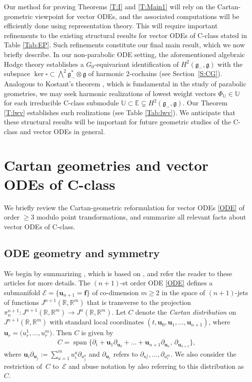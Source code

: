 \documentclass[10pt,a4paper]{amsart}
\newcommand\tensor{\otimes}
\DeclareMathOperator{\sn}{span}
\newcommand{\g}{\mathfrak{g}}
\newcommand\bu{\mathbf{u}}
\newcommand{\R}{\mathbb{R}}
\newcommand\bbE{\mathbb{E}}
\newcommand\bbU{\mathbb{U}}
\newcommand\cE{\mathcal{E}}
\numberwithin{equation}{section}
\begin{document}
Our method for proving Theorems \ref{T:I} and \ref{T:Main1} will rely on the Cartan-geometric viewpoint for vector ODEs, and the associated computations will be efficiently done using representation theory. This will require important refinements to the existing structural results for vector ODEs of C-class stated in Table \ref{Tab:EP}. Such refinements constitute our final main result, which we now briefly describe. In our non-parabolic ODE setting, the aforementioned algebraic Hodge theory establishes a $G_0$-equivariant identification of $H^2(\g_-,\g)$ with the subspace ${\ker \square \subset \bigwedge^2 \g_-^* \tensor \g}$ of harmonic 2-cochains (see Section~\ref{S:CG}). Analogous to Kostant's theorem \cite{Kostant1961}, which is fundamental in the study of parabolic geometries, we may seek harmonic realizations of lowest weight vectors $\Phi_\bbU \in \bbU$ for each irreducible C-class submodule $\bbU \subset \bbE \subsetneq H^2(\g_-,\g)$. Our Theorem \ref{T:lwv} establishes such realizations (see Table \ref{Tab:lwv}). We anticipate that these structural results will be important for future geometric studies of the C-class and vector ODEs in general.

\section{Cartan geometries and vector ODEs of C-class} \label{S:CGP}

We briefly review the Cartan-geometric reformulation for vector ODEs \eqref{ODE} of order $\ge 3$ modulo point transformations, and summarize all relevant facts about vector ODEs of C-class.

\subsection{ODE geometry and symmetry}\label{S:GS}

We begin by summarizing \cite[Section~2.1]{KT2021}, which is based on \cite{Doubrov2001,DKM1999,DM2014}, and refer the reader to these articles for more details. The $(n+1)$-st order ODE \eqref{ODE} defines a submanifold ${\mathcal{E} = \{ \bu_{n+1} = \mathbf{f} \}}$ of co-dimension $m \ge 2$ in the space of $(n+1)$-jets of functions $J^{n+1}(\R, \R^m)$ that is transverse to the projection $\pi_n^{n+1}\colon J^{n+1}(\R, \R^m) \to J^{n}(\R, \R^m)$. Let $C$ denote the {\em Cartan distribution} on $J^{n+1}(\R, \R^m)$ with standard local coordinates $(t, \bu_0, \bu_1,\dots,\bu_{n+1})$, where $\bu_r = \big(u_r^1,\dots,u_r^m\big)$. Then $C$ is given by
\begin{align*}
C = \sn \{\partial_t + \bu_1 \partial_{\bu_0} + \dots + \bu_{n+1} \partial_{\bu_n},\, \partial_{\bu_{n+1}} \},
\end{align*}
where $\bu_i \partial_{\bu_j} :=\sum_{a=1}^m u_i^a \partial_{u_j^a}$ and $\partial_{\bu_r}$ refers to $\partial_{u_r^1},\dots,\partial_{u_r^m}$. We also consider the restriction of~$C$ to~$\cE$ and abuse notation by also referring to this distribution as $C$.
	
\end{document}
